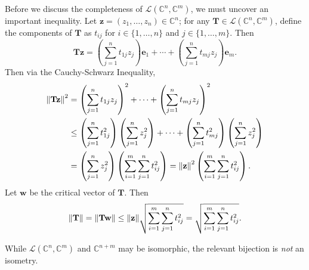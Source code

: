 \documentclass[11pt]{article}
\renewcommand{\vec}[1]{\mathbf{#1}}
\newcommand{\mat}[1]{\mathbf{#1}}
\begin{document}
Before we discuss the completeness of $\mathcal{L}(\mathbb{C}^{n}, \mathbb{C}^{m})$, we must uncover an important inequality. Let $\vec{z} = (z_{1}, \ldots, z_{n}) \in \mathbb{C}^{n}$; for any $\mat{T} \in \mathcal{L}(\mathbb{C}^{n}, \mathbb{C}^{m})$, define the components of $\mat{T}$ as $t_{ij}$ for $i \in \{ 1, \ldots, n \}$ and $j \in \{ 1, \ldots, m \}$. Then
\[
	\mat{T} \vec{z} = \left( \sum\limits_{j = 1}^{n} t_{1j}z_{j} \right) \vec{e}_{1} + \cdots + \left( \sum\limits_{j = 1}^{n} t_{mj} z_{j} \right) \vec{e}_{m}.
\]
Then via the Cauchy-Schwarz Inequality,
\begin{align*}
	\norm{\mat{T} \vec{z}}^{2} &= \left( \sum_{j = 1}^{n} t_{1j} z_{j} \right)^{2} + \cdots + \left( \sum_{j = 1}^{n} t_{mj} z_{j} \right)^{2} \\
	& \le \left( \sum_{j = 1}^{n} t_{1j}^{2} \right) \left( \sum_{j = 1}^{n} z_{j}^{2} \right) + \cdots + \left( \sum_{j = 1}^{n} t_{mj}^{2} \right) \left( \sum_{j = 1}^{n} z_{j}^{2} \right) \\
	&= \left( \sum_{j = 1}^{n} z_{j}^{2} \right) \left( \sum_{i = 1}^{m} \sum_{j = 1}^{n} t_{ij}^{2} \right) = \norm{\vec{z}}^{2} \left( \sum_{i = 1}^{m} \sum_{j = 1}^{n} t_{ij}^{2} \right).
\end{align*}
Let $\vec{w}$ be the critical vector of $\mat{T}$. Then
\[
	\norm{\mat{T}} = \norm{\mat{T} \vec{w}} \le \norm{\vec{z}} \sqrt{\sum\limits_{i = 1}^{m} \sum\limits_{j = 1}^{n} t_{ij}^{2}} = \sqrt{\sum\limits_{i = 1}^{m} \sum\limits_{j = 1}^{n} t_{ij}^{2}}.
\]

While $\mathcal{L}(\mathbb{C}^{n}, \mathbb{C}^{m})$ and $\mathbb{C}^{n + m}$ may be isomorphic, the relevant bijection is \textit{not} an isometry. 
\end{document}
